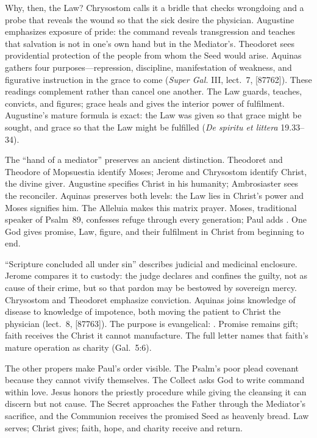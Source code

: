 Why, then, the Law? Chrysostom calls it a bridle that checks wrongdoing and a
probe that reveals the wound so that the sick desire the physician. Augustine
emphasizes exposure of pride: the command reveals transgression and teaches
that salvation is not in one's own hand but in the Mediator's. Theodoret sees
providential protection of the people from whom the Seed would arise. Aquinas
gathers four purposes---repression, discipline, manifestation of weakness, and
figurative instruction in the grace to come (\emph{Super Gal.} III, lect.~7,
[87762]). These readings complement rather than cancel one another. The
Law guards, teaches, convicts, and figures; grace heals and gives the interior
power of fulfilment. Augustine's mature formula is exact: the Law was given so
that grace might be sought, and grace so that the Law might be fulfilled
(\emph{De spiritu et littera} 19.33--34).

\enlargethispage{-\baselineskip}
The ``hand of a mediator'' preserves an ancient distinction. Theodoret and
Theodore of Mopsuestia identify Moses; Jerome and Chrysostom identify Christ,
the divine giver. Augustine specifies Christ in his humanity; Ambrosiaster
sees the reconciler. Aquinas preserves both levels: the Law lies in Christ's
power and Moses signifies him. The Alleluia makes this matrix prayer. Moses,
traditional speaker of Psalm~89, confesses refuge through every generation;
Paul adds . One God gives promise, Law, figure, and
their fulfilment in Christ from beginning to end.

``Scripture concluded all under sin'' describes judicial and medicinal
enclosure. Jerome compares it to custody: the judge declares and confines the
guilty, not as cause of their crime, but so that pardon may be bestowed by
sovereign mercy. Chrysostom and Theodoret emphasize conviction. Aquinas joins
knowledge of disease to knowledge of impotence, both moving the patient to
Christ the physician (lect.~8, [87763]). The purpose is evangelical:
. Promise remains
gift; faith receives the Christ it cannot manufacture. The full letter names
that faith's mature operation as charity (Gal.~5:6).

The other propers make Paul's order visible. The Psalm's poor plead covenant
because they cannot vivify themselves. The Collect asks God to write command
within love. Jesus honors the priestly procedure while giving the cleansing it
can discern but not cause. The Secret approaches the Father through the
Mediator's sacrifice, and the Communion receives the promised Seed as heavenly
bread. Law serves; Christ gives; faith, hope, and charity receive and return.

